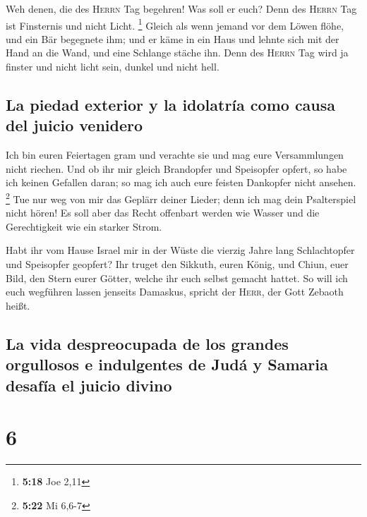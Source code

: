  Weh denen, die des \textsc{Herrn} Tag begehren! Was soll
er euch? Denn des \textsc{Herrn} Tag ist Finsternis und nicht Licht.
\footnote{\textbf{5:18} Joe 2,11}  Gleich als wenn jemand
vor dem Löwen flöhe, und ein Bär begegnete ihm; und er käme in ein Haus
und lehnte sich mit der Hand an die Wand, und eine Schlange stäche ihn.
 Denn des \textsc{Herrn} Tag wird ja finster und nicht
licht sein, dunkel und nicht hell.

\hypertarget{la-piedad-exterior-y-la-idolatruxeda-como-causa-del-juicio-venidero}{%
\subsection{La piedad exterior y la idolatría como causa del juicio
venidero}\label{la-piedad-exterior-y-la-idolatruxeda-como-causa-del-juicio-venidero}}

 Ich bin euren Feiertagen gram und verachte sie und mag
eure Versammlungen nicht riechen.  Und ob ihr mir gleich
Brandopfer und Speisopfer opfert, so habe ich keinen Gefallen daran; so
mag ich auch eure feisten Dankopfer nicht ansehen. \footnote{\textbf{5:22}
  Mi 6,6-7}  Tue nur weg von mir das Geplärr deiner
Lieder; denn ich mag dein Psalterspiel nicht hören!  Es
soll aber das Recht offenbart werden wie Wasser und die Gerechtigkeit
wie ein starker Strom.

 Habt ihr vom Hause Israel mir in der Wüste die vierzig
Jahre lang Schlachtopfer und Speisopfer geopfert?  Ihr
truget den Sikkuth, euren König, und Chiun, euer Bild, den Stern eurer
Götter, welche ihr euch selbst gemacht hattet.  So will
ich euch wegführen lassen jenseits Damaskus, spricht der \textsc{Herr},
der Gott Zebaoth heißt.

\hypertarget{la-vida-despreocupada-de-los-grandes-orgullosos-e-indulgentes-de-juduxe1-y-samaria-desafuxeda-el-juicio-divino}{%
\subsection{La vida despreocupada de los grandes orgullosos e
indulgentes de Judá y Samaria desafía el juicio
divino}\label{la-vida-despreocupada-de-los-grandes-orgullosos-e-indulgentes-de-juduxe1-y-samaria-desafuxeda-el-juicio-divino}}

\hypertarget{section-5}{%
\section{6}\label{section-5}}

